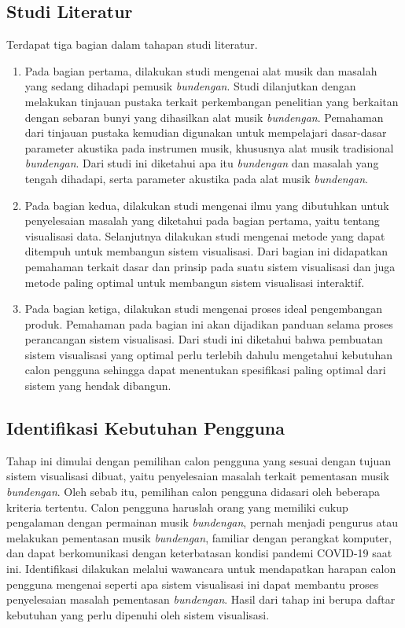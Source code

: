 \subsection{Studi Literatur}
Terdapat tiga bagian dalam tahapan studi literatur.
\begin{enumerate}
    \item Pada bagian pertama, dilakukan studi mengenai alat musik \bundengan dan masalah yang sedang dihadapi pemusik \textit{bundengan}. Studi dilanjutkan dengan melakukan tinjauan pustaka terkait perkembangan penelitian yang berkaitan dengan sebaran bunyi yang dihasilkan alat musik \textit{bundengan}. Pemahaman dari tinjauan pustaka kemudian digunakan untuk mempelajari dasar-dasar parameter akustika pada instrumen musik, khususnya alat musik tradisional \textit{bundengan}. Dari studi ini diketahui apa itu \textit{bundengan} dan masalah yang tengah dihadapi, serta parameter akustika pada alat musik \textit{bundengan}.
    \item Pada bagian kedua, dilakukan studi mengenai ilmu yang dibutuhkan untuk penyelesaian masalah yang diketahui pada bagian pertama, yaitu tentang visualisasi data. Selanjutnya dilakukan studi mengenai metode yang dapat ditempuh untuk membangun sistem visualisasi. Dari bagian ini didapatkan pemahaman terkait dasar dan prinsip pada suatu sistem visualisasi dan juga metode paling optimal untuk membangun sistem visualisasi interaktif.
    \item Pada bagian ketiga, dilakukan studi mengenai proses ideal pengembangan produk. Pemahaman pada bagian ini akan dijadikan panduan selama proses perancangan sistem visualisasi. Dari studi ini diketahui bahwa pembuatan sistem visualisasi yang optimal perlu terlebih dahulu mengetahui kebutuhan calon pengguna sehingga dapat menentukan spesifikasi paling optimal dari sistem yang hendak dibangun.
\end{enumerate}
\subsection{Identifikasi Kebutuhan Pengguna}
Tahap ini dimulai dengan pemilihan calon pengguna yang sesuai dengan tujuan sistem visualisasi dibuat, yaitu penyelesaian masalah terkait pementasan musik \textit{bundengan}. Oleh sebab itu, pemilihan calon pengguna didasari oleh beberapa kriteria tertentu. Calon pengguna haruslah orang yang memiliki cukup pengalaman dengan permainan musik \textit{bundengan}, pernah menjadi pengurus atau melakukan pementasan musik \textit{bundengan}, familiar dengan perangkat komputer, dan dapat berkomunikasi dengan keterbatasan kondisi pandemi COVID-19 saat ini. Identifikasi dilakukan melalui wawancara untuk mendapatkan harapan calon pengguna mengenai seperti apa sistem visualisasi ini dapat membantu proses penyelesaian masalah pementasan \textit{bundengan}. Hasil dari tahap ini berupa daftar kebutuhan yang perlu dipenuhi oleh sistem visualisasi. \par 
